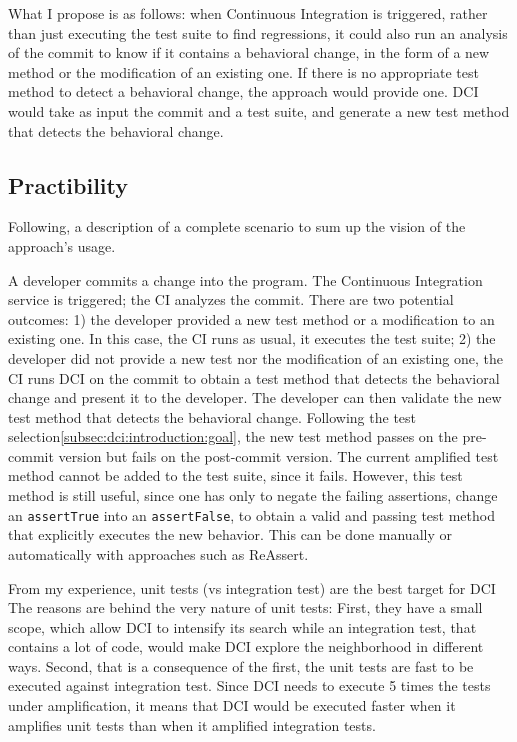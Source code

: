 What I propose is as follows: 
when Continuous Integration is triggered, 
rather than just executing the test suite to find regressions, 
it could also run an analysis of the commit to know if it contains a behavioral change, 
in the form of a new method or the modification of an existing one.
If there is no appropriate test method to detect a behavioral change, the approach would provide one. 
DCI would take as input the commit and a test suite, and generate a new test method that detects the behavioral change.

\subsection{Practibility}
\label{subsec:dci:background:praticability}

Following, a description of a complete scenario to sum up the vision of the approach's usage.

A developer commits a change into the program.
The Continuous Integration service is triggered;
the CI analyzes the commit.
There are two potential outcomes:
1) the developer provided a new test method or a modification to an existing one. 
In this case, the CI runs as usual, \eg it executes the test suite;
2) the developer did not provide a new test nor the modification of an existing one, the CI runs DCI on the commit to obtain a test method that detects the behavioral change and present it to the developer.
The developer can then validate the new test method that detects the behavioral change.
Following the test selection\autoref{subsec:dci:introduction:goal}, the new test method passes on the pre-commit version but fails on the post-commit version.
The current amplified test method cannot be added to the test suite, since it fails.
However, this test method is still useful, since one has only to negate the failing assertions, \eg change an \texttt{assertTrue} into an \texttt{assertFalse}, to obtain a valid and passing test method that explicitly executes the new behavior.
This can be done manually or automatically with approaches such as ReAssert\cite{ReAssert}.

From my experience, unit tests (vs integration test) are the best target for DCI
The reasons are behind the very nature of unit tests:
First, they have a small scope, which allow DCI to intensify its search while an integration test, that contains a lot of code, would make DCI explore the neighborhood in different ways.
Second, that is a consequence of the first, the unit tests are fast to be executed against integration test.
Since DCI needs to execute 5 times the tests under amplification, it means that DCI would be executed faster when it amplifies unit tests than when it amplified integration tests.

